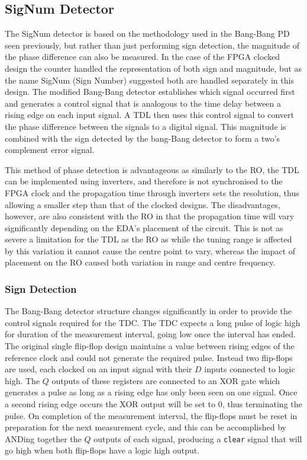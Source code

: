 \subsection{SigNum Detector}\label{section:signum}
The SigNum detector is based on the methodology used in the Bang-Bang \acl{PD} seen previously, but rather than just performing sign detection, the magnitude of the phase difference can also be measured. In the case of the \ac{FPGA} clocked design the counter handled the representation of both sign and magnitude, but as the name SigNum (Sign Number) suggested both are handled separately in this design. The modified Bang-Bang detector establishes which signal occurred first and generates a control signal that is analogous to the time delay between a rising edge on each input signal. A \ac{TDL} then uses this control signal to convert the phase difference between the signals to a digital signal. This magnitude is combined with the sign detected by the bang-Bang detector to form a two's complement error signal.

This method of phase detection is advantageous as similarly to the \acl{RO}, the \ac{TDL} can be implemented using inverters, and therefore is not synchronised to the \ac{FPGA} clock and the propagation time through inverters sets the resolution, thus allowing a smaller step than that of the clocked designs. The disadvantages, however, are also consistent with the \ac{RO} in that the propagation time will vary significantly depending on the \ac{EDA}'s placement of the circuit. This is not as severe a limitation for the \ac{TDL} as the \ac{RO} as while the tuning range is affected by this variation it cannot cause the centre point to vary, whereas the impact of placement on the \ac{RO} caused both variation in range and centre frequency.


\subsubsection{Sign Detection}
The Bang-Bang detector structure changes significantly in order to provide the control signals required for the \ac{TDC}. The \ac{TDC} expects a long pulse of logic high for duration of the measurement interval, going low once the interval has ended. The original single flip-flop design maintains a value between rising edges of the reference clock and could not generate the required pulse. Instead two flip-flops are used, each clocked on an input signal with their $D$ inputs connected to logic high. The $Q$ outputs of these registers are connected to an \acs{XOR} gate which generates a pulse as long as a rising edge has only been seen on one signal. Once a second rising edge occurs the \acs{XOR} output will be set to 0, thus terminating the pulse. On completion of the measurement interval, the flip-flops must be reset in preparation for the next measurement cycle, and this can be accomplished by ANDing together the $Q$ outputs of each signal, producing a \texttt{clear} signal that will go high when both flip-flops have a logic high output.


